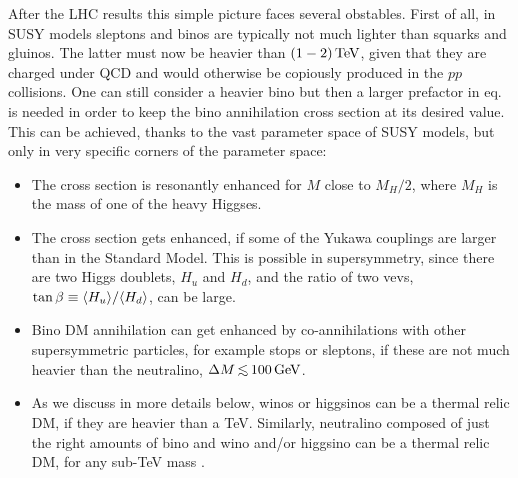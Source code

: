 After the LHC results this simple picture faces several obstables. First of all, in SUSY models sleptons and binos are typically not much lighter than squarks and gluinos. The latter must now be heavier than $(1-2)\,{\rm TeV}$, given that they are charged under QCD and would otherwise 	be copiously produced in the $pp$ collisions. 
One can still consider a heavier bino
but then a larger prefactor in eq. is needed in order to keep the bino annihilation
cross section at its desired value.
This can be achieved, thanks to the vast parameter space of SUSY models, but only in very specific
corners of the parameter space:
\begin{itemize}
\item[$\circ$] The cross section is resonantly enhanced for $M$ close to $M_H/2$, where $M_H$ is the mass of one of the heavy Higgses.

\item[$\circ$] The cross section gets enhanced, if some of the Yukawa couplings are larger than in the Standard Model.
This is possible in supersymmetry, since there are two Higgs doublets, $H_{u}$ and $H_{d}$,
and the ratio of two vevs, $\tan\beta \equiv \langle H_{u}\rangle/\langle H_{d}\rangle$, can be large.

\item[$\circ$] Bino DM annihilation can get enhanced by co-annihilations with other supersymmetric particles, for example 
stops or sleptons, if these are not much heavier than the neutralino, $\Delta M\circa{<} 100\GeV$.

\item[$\circ$] As we discuss in more details below, winos or higgsinos can be a thermal relic DM,
 if they are heavier than a TeV.
Similarly, neutralino composed of just the right amounts of bino and
wino and/or higgsino can be a thermal relic DM,  for any sub-TeV mass \cite{WellTempered}.
\end{itemize}


